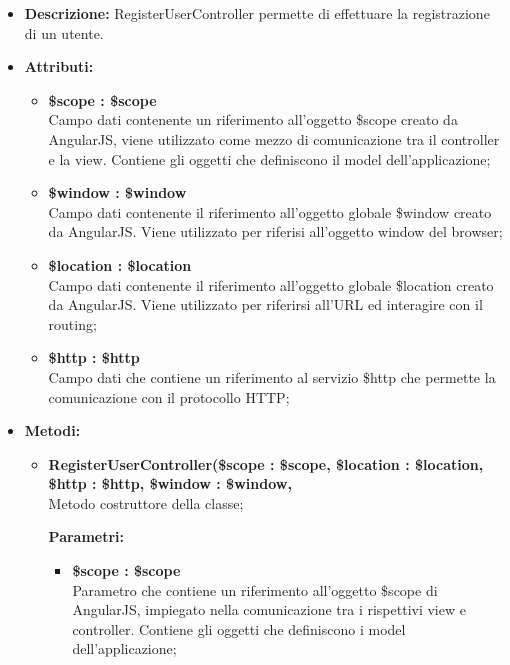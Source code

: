 \begin{itemize}
	\item \textbf{Descrizione:} RegisterUserController permette di effettuare la registrazione di un utente.
	\item \textbf{Attributi:}
	\begin{itemize}
		
		\item \textbf{\$scope : \$scope}\\
		Campo dati contenente un riferimento all'oggetto \$scope creato da AngularJS, viene utilizzato come mezzo di comunicazione tra il controller e la view. Contiene gli oggetti che definiscono il model dell'applicazione;
		
		\item \textbf{\$window : \$window}\\
		Campo dati contenente il riferimento all'oggetto globale \$window creato da AngularJS. Viene utilizzato per riferisi all'oggetto window del browser;
		
		\item \textbf{\$location : \$location }\\
		Campo dati contenente il riferimento all'oggetto globale \$location creato da AngularJS. Viene utilizzato per riferirsi all'URL ed interagire con il routing;
		
		\item \textbf{\$http : \$http }\\
		Campo dati che contiene un riferimento al servizio \$http che permette la comunicazione con il protocollo HTTP;
		
		
	\end{itemize}
	\item \textbf{Metodi:}
	\begin{itemize}
		
		\item \textbf{RegisterUserController(\$scope : \$scope, \$location : \$location, \$http : \$http, \$window : \$window,}\\
		Metodo costruttore della classe;
		\begin{description}
			\item[\textbf{Parametri:}]
		\end{description}
		\begin{itemize}
			\item \textbf{\$scope : \$scope}\\
			Parametro che contiene un riferimento all'oggetto \$scope di AngularJS, impiegato nella comunicazione tra i rispettivi view e controller. Contiene gli oggetti che definiscono i model dell'applicazione;
			

\end{itemize}
\end{itemize}
\end{itemize}
